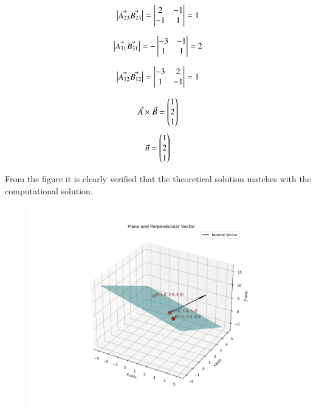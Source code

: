 \documentclass[journal]{IEEEtran}
\theoremstyle{remark}
\begin{document}
\begin{align}
 \begin{vmatrix}\Vec{A_{23}}\Vec{B_{23}}\end{vmatrix}=\begin{vmatrix}2&-1\\-1&1\end{vmatrix}=1
\end{align}

\begin{align}
 \begin{vmatrix}\Vec{A_{31}} \Vec{B_{31}}\end{vmatrix}=-\begin{vmatrix}-3&-1\\1&1\end{vmatrix}=2
\end{align}

\begin{align}
 \begin{vmatrix}\Vec{A_{12}} \Vec{B_{12}}\end{vmatrix}=\begin{vmatrix}-3&2\\1&-1\end{vmatrix}=1
\end{align}

\begin{align}
  \Vec{A}\times\Vec{B}=\begin{pmatrix}1\\2\\1\end{pmatrix}
\end{align}
\begin{align}
   \Vec{n}=\begin{pmatrix}1\\2\\1\end{pmatrix}
\end{align}



From the figure it is clearly verified that the theoretical solution matches with the computational solution.\\
\begin{figure}[h]
    \centering
    \includegraphics[height=0.5\textheight, keepaspectratio]{figs/figure1.png}
    \label{figure_1}
\end{figure}
\end{document}

